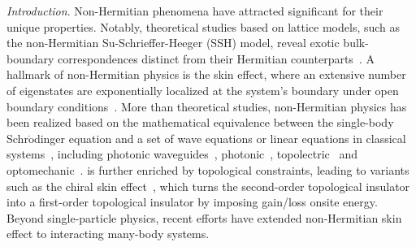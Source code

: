 \documentclass[longbibliography, aps, prx, amsmath, amssymb, amsfonts, twocolumn,superscriptaddress, footinbib]{revtex4-1}
\begin{document}
	\textit{Introduction}. Non-Hermitian phenomena have attracted significant {\color{blue}{attentions}} for their unique properties. Notably, theoretical studies based on lattice models, such as the non-Hermitian Su-Schrieffer-Heeger (SSH) model, reveal exotic bulk-boundary correspondences distinct from their Hermitian counterparts~\cite{RN1166,RN1168}. 
	A hallmark of non-Hermitian physics is the skin effect, where an extensive number of eigenstates are exponentially localized at the system's boundary under open boundary conditions~\cite{gong2018topological,kawabata2019symmetry,RN1212,RN1214,RN1217,RN1160}. %
	More than theoretical studies, non-Hermitian physics has been realized based on the mathematical equivalence between the single-body Schr$\ddot{\mathrm{o}}$dinger equation and a set of wave equations or linear equations in classical systems~\cite{RN1161}, including photonic waveguides~\cite{nie2023non}, photonic~\cite{RN1165,RN1167,RN1227}, topolectric~\cite{zou2021observation,RN2,RN1225} and optomechanic~\cite{RN632,RN1226}. 
	{\color{blue}{The skin effect}} is further enriched by topological constraints, leading to variants such as the chiral skin effect~\cite{nakamura2023universal, ma2024non,schindler2023hermitian,lee2019hybrid,RN1221}, which turns the second-order topological insulator into a first-order topological insulator by imposing gain/loss onsite energy. 
	Beyond single-particle physics, recent efforts have extended non-Hermitian skin effect to interacting many-body systems. %
\end{document}
